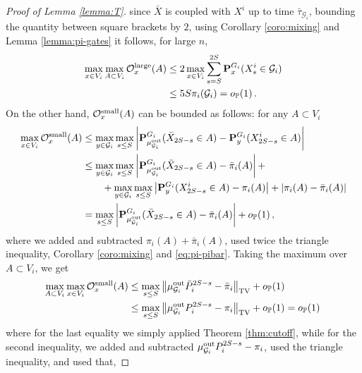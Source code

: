 \documentclass[11pt,oneside]{amsart}
\numberwithin{equation}{section}  %
\theoremstyle{plain}
\newcommand{\p}{\mathbb{P}}
\newcommand{\op}{o_{\p}}
\newcommand{\quench}{\mathbf{P}}
\newcommand{\gates}{\mathcal{G}}
\newcommand{\muout}{\mu^{\rm out}_{\gates_i}}
\begin{document}
\begin{proof}[Proof of Lemma \ref{lemma:T}]
 since $\bar{X}$ is coupled with $X^i$ up to time $\bar{\tau}_{\gates_i}$, bounding the quantity between square brackets by $2$, using Corollary \ref{coro:mixing} and Lemma \ref{lemma:pi-gates} it follows, for large $n$,
 \begin{equation}\label{eq:OxAlarge}
 	\begin{split}
 	\max_{x\in V_i}\max_{A\subset V_i}\mathcal{O}^{\rm large}_x(A)
    &\le 	2\max_{x\in V_i}\sum_{s=S}^{2S}\quench^{G_i}_x(X^i_s\in\gates_i)\\
 	&
 	\le 5{S}\pi_i(\gates_i)=\op(1)\,.
 	\end{split}
 \end{equation}
 On the other hand,  $\mathcal{O}^{\rm small}_x(A)$ can be bounded as follows: for any $A\subset V_i$
  \begin{equation}\label{eq:OxAsmall1}
 	\begin{split}
 		\max_{x\in V_i}\mathcal{O}^{\rm small}_x(A)&\le 	\max_{y\in\gates_i}\max_{s\le S}\left|{\quench}^{G_i}_{\muout}(\bar X_{{2S}-s}\in A)-\quench^{G_i}_y(X^i_{{2S}-s}\in A) \right|\\
 		&\le 	\max_{y\in\gates_i}\max_{s\le S}\left|{\quench}^{G_i}_{\muout}(\bar X_{{2S}-s}\in A)-\bar{\pi}_i(A)\right|+\\
 		&\qquad	+\max_{y\in\gates_i}\max_{s\le S}\left|{\quench}^{G_i}_y( X^i_{{2S}-s}\in A)-\pi_i(A) \right|+|\pi_i(A)-\bar{\pi}_i(A)|\\
 		&=	\max_{s\le S}\left|{\quench}^{G_i}_{\muout}(\bar X_{{2S}-s}\in A)-\bar{\pi}_i(A)\right|+\op(1)\,,
 	\end{split}
 \end{equation}
 where we added and subtracted $\pi_i(A) +\bar{\pi}_i(A)$, used twice the triangle inequality, Corollary \ref{coro:mixing} and \eqref{eq:pi-pibar}. Taking the maximum over $A\subset V_i$, we get
%
 \begin{equation}\label{eq:OxAsmall2}
 		\begin{split}
 		\max_{A\subset V_i}\max_{x\in V_i}\mathcal{O}^{\rm small}_x(A)&\le 
        \max_{s\le S}\left\|\muout\bar{P}_i^{{2S}-s}-\bar{\pi}_i\right\|_{\rm TV}+\op(1)\\
 		&\le \max_{s\le S}\left\|\muout  P_i^{2S-s}-\pi_i \right\|_{\rm TV}+\op(1)=\op(1)\,
 	\end{split}
 \end{equation}
 where for the last equality we simply applied Theorem \ref{thm:cutoff}, while for the second inequality, we added and subtracted $\muout P_i^{2S-s}-\pi_i$, used the triangle inequality, and used that,

\end{proof}
\end{document}
